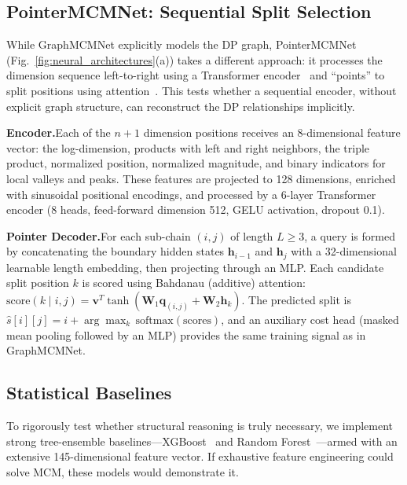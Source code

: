 \documentclass[conference]{IEEEtran}
\begin{document}
\subsection{PointerMCMNet: Sequential Split Selection}
\label{sec:pointer}

While GraphMCMNet explicitly models the DP graph, PointerMCMNet (Fig.~\ref{fig:neural_architectures}(a)) takes a different approach: it processes the dimension sequence left-to-right using a Transformer encoder~\cite{b11} and ``points'' to split positions using attention~\cite{b7,b9}. This tests whether a sequential encoder, without explicit graph structure, can reconstruct the DP relationships implicitly.

\medskip
\noindent\textbf{Encoder.}\quad Each of the $n{+}1$ dimension positions receives an 8-dimensional feature vector: the log-dimension, products with left and right neighbors, the triple product, normalized position, normalized magnitude, and binary indicators for local valleys and peaks. These features are projected to 128 dimensions, enriched with sinusoidal positional encodings, and processed by a 6-layer Transformer encoder (8 heads, feed-forward dimension 512, GELU activation, dropout 0.1).

\medskip
\noindent\textbf{Pointer Decoder.}\quad For each sub-chain $(i,j)$ of length $L \geq 3$, a query is formed by concatenating the boundary hidden states $\mathbf{h}_{i-1}$ and $\mathbf{h}_j$ with a 32-dimensional learnable length embedding, then projecting through an MLP. Each candidate split position $k$ is scored using Bahdanau (additive) attention: $\text{score}(k \mid i,j) = \mathbf{v}^T \tanh(\mathbf{W}_1 \mathbf{q}_{(i,j)} + \mathbf{W}_2 \mathbf{h}_k)$. The predicted split is $\hat{s}[i][j] = i + \arg\max_k \, \text{softmax}(\text{scores})$, and an auxiliary cost head (masked mean pooling followed by an MLP) provides the same training signal as in GraphMCMNet.


\subsection{Statistical Baselines}
\label{sec:baselines}

To rigorously test whether structural reasoning is truly necessary, we implement strong tree-ensemble baselines---XGBoost~\cite{b12} and Random Forest~\cite{b13}---armed with an extensive 145-dimensional feature vector. If exhaustive feature engineering could solve MCM, these models would demonstrate it.
\end{document}
